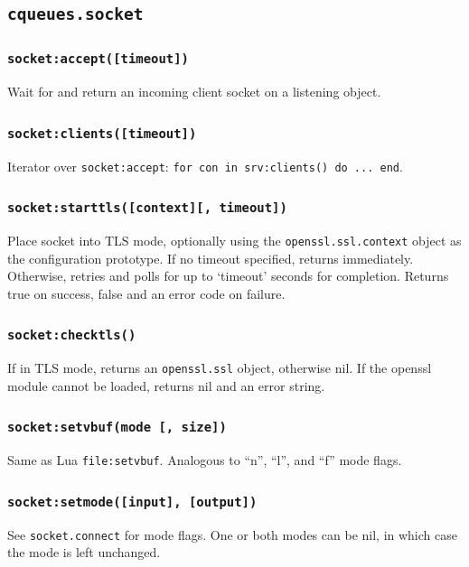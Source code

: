 \documentclass[11pt, oneside]{memoir}
\newcommand*{\fn}[1]{\texttt{#1}\xspace}
\newcommand*{\method}[1]{\texttt{#1}\xspace}
\newcommand*{\module}[1]{\texttt{#1}\xspace}
\newcounter{toccols}
\newenvironment{Module}[1]{
	\subsection{\texttt{#1}}
	\addtocontents{toc}{
		\protect\begin{multicols}{\value{toccols}}
	}
}{
	\addtocontents{toc}{\protect\end{multicols}}
}
\begin{document}
\begin{Module}{cqueues.socket}
\subsubsection[\fn{socket:accept}]{\fn{socket:accept([timeout])}}
Wait for and return an incoming client socket on a listening object.

\subsubsection[\fn{socket:clients}]{\fn{socket:clients([timeout])}}
Iterator over \method{socket:accept}: \texttt{for con in srv:clients() do ... end}.


\subsubsection[\fn{socket:starttls}]{\fn{socket:starttls([context][, timeout])}}
Place socket into TLS mode, optionally using the \module{openssl.ssl.context} object as the configuration prototype. If no timeout specified,  returns immediately. Otherwise, retries and polls for up to `timeout' seconds for completion. Returns true on success, false and an error code on failure.

\subsubsection[\fn{socket:checktls}]{\fn{socket:checktls()}}

If in TLS mode, returns an \module{openssl.ssl} object, otherwise nil. If the openssl module cannot be loaded, returns nil and an error string.

\subsubsection[\fn{socket:setvbuf}]{\fn{socket:setvbuf(mode [, size])}}
Same as Lua \fn{file:setvbuf}. Analogous to ``n'', ``l'', and ``f'' mode flags.

\subsubsection[\fn{socket:setmode}]{\fn{socket:setmode([input], [output])}}
See \fn{socket.connect} for mode flags. One or both modes can be nil, in which case the mode is left unchanged.


\end{Module}
\end{document}
